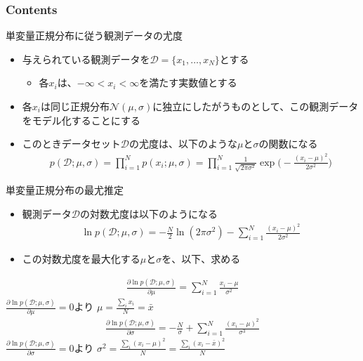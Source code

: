 \documentclass[aspectratio=169,unicode,dvipdfmx,14pt]{beamer}
\begin{document}
\begin{frame}\frametitle{Contents}
\Large \tableofcontents[currentsection]
\end{frame}

\begin{frame}{単変量正規分布に従う観測データの尤度}
\begin{itemize}
\item 与えられている観測データを$\mathcal{D}=\{x_1,\ldots,x_N\}$とする
\begin{itemize}
\item 各$x_i$は、$-\infty < x_i < \infty$を満たす実数値とする
\end{itemize}
\item 各$x_i$は同じ正規分布$\mathcal{N}(\mu,\sigma)$に独立にしたがうものとして、この観測データをモデル化することにする
\item このときデータセット$\mathcal{D}$の尤度は、以下のような$\mu$と$\sigma$の関数になる
\begin{align}
p(\mathcal{D};\mu,\sigma)=\prod_{i=1}^N p(x_i;\mu,\sigma)
=\prod_{i=1}^N \frac{1}{\sqrt{2\pi\sigma^2}}\exp\bigg( - \frac{(x_i - \mu)^2}{2\sigma^2}\bigg)
\end{align}
\end{itemize}
\end{frame}


\begin{frame}{単変量正規分布の最尤推定}
\begin{itemize}
\item 観測データ$\mathcal{D}$の対数尤度は以下のようになる
\begin{align}
\ln p(\mathcal{D};\mu,\sigma)
= -\frac{N}{2}\ln(2\pi\sigma^2) - \sum_{i=1}^N \frac{(x_i - \mu)^2}{2\sigma^2}
\end{align}
\item この対数尤度を最大化する$\mu$と$\sigma$を、以下、求める
\end{itemize}
\end{frame}


\begin{frame}
\begin{align}
\frac{\partial \ln p(\mathcal{D};\mu,\sigma)}{\partial \mu}
= \sum_{i=1}^N \frac{x_i - \mu}{\sigma^2}
\end{align}
$\frac{\partial \ln p(\mathcal{D};\mu,\sigma)}{\partial \mu}=0$より
$\mu = \frac{\sum_i x_i}{N} = \bar{x}$
\begin{align}
\frac{\partial \ln p(\mathcal{D};\mu,\sigma)}{\partial \sigma}
= - \frac{N}{\sigma} + \sum_{i=1}^N \frac{(x_i - \mu)^2}{\sigma^3}
\end{align}
$\frac{\partial \ln p(\mathcal{D};\mu,\sigma)}{\partial \sigma} = 0$より
$\sigma^2 = \frac{\sum_i (x_i - \mu)^2}{N} = \frac{\sum_i (x_i - \bar{x})^2}{N}$
\end{frame}
\end{document}
